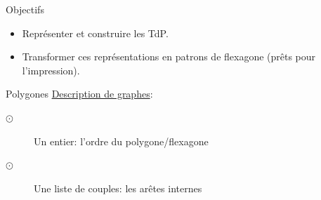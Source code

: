 \documentclass[french,xcolor=dvipsnames]{beamer}
\begin{document}
		\begin{frame}{Objectifs}
			\begin{itemize}
					\item Représenter et construire les TdP.
					\item Transformer ces représentations en patrons de flexagone (prêts pour l'impression).
			\end{itemize}		
		\end{frame}
		
		\begin{frame}{Polygones}
		\underline{Description de graphes}:\\
			\begin{description}
			\item[$\odot$]Un entier: l'ordre du polygone/flexagone
			\item[$\odot$]Une liste de couples: les arêtes internes
			\end{description}
			

\end{frame}
\end{document}
